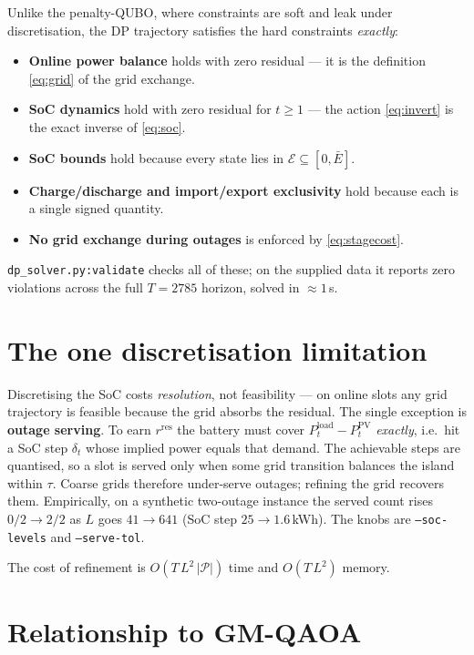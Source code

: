 \documentclass[11pt]{article}
\newcommand{\Ppv}{P^{\text{PV}}}
\newcommand{\Pload}{P^{\text{load}}}
\newcommand{\rres}{r^{\text{res}}}
\begin{document}
Unlike the penalty-QUBO, where constraints are soft and leak under
discretisation, the DP trajectory satisfies the hard constraints \emph{exactly}:
\begin{itemize}
  \item \textbf{Online power balance} holds with zero residual --- it is the
        definition \eqref{eq:grid} of the grid exchange.
  \item \textbf{SoC dynamics} hold with zero residual for $t\ge 1$ --- the
        action \eqref{eq:invert} is the exact inverse of \eqref{eq:soc}.
  \item \textbf{SoC bounds} hold because every state lies in $\mathcal{E}\subseteq[0,\bar E]$.
  \item \textbf{Charge/discharge and import/export exclusivity} hold because
        each is a single signed quantity.
  \item \textbf{No grid exchange during outages} is enforced by
        \eqref{eq:stagecost}.
\end{itemize}
\texttt{dp\_solver.py:validate} checks all of these; on the supplied data it
reports zero violations across the full $T=2785$ horizon, solved in $\approx 1$\,s.

\section{The one discretisation limitation}\label{sec:limit}

Discretising the SoC costs \emph{resolution}, not feasibility --- on online
slots any grid trajectory is feasible because the grid absorbs the residual. The
single exception is \textbf{outage serving}. To earn $\rres$ the battery must
cover $\Pload_t-\Ppv_t$ \emph{exactly}, i.e.\ hit a SoC step $\delta_t$ whose
implied power equals that demand. The achievable steps are quantised, so a slot
is served only when some grid transition balances the island within $\tau$.
Coarse grids therefore under-serve outages; refining the grid recovers them.
Empirically, on a synthetic two-outage instance the served count rises
$0/2 \to 2/2$ as $L$ goes $41 \to 641$ (SoC step $25 \to 1.6$\,kWh). The knobs
are \texttt{--soc-levels} and \texttt{--serve-tol}.

The cost of refinement is $O(T\,L^2\,|\mathcal{P}|)$ time and $O(T\,L^2)$ memory.

\section{Relationship to GM-QAOA}
\end{document}
